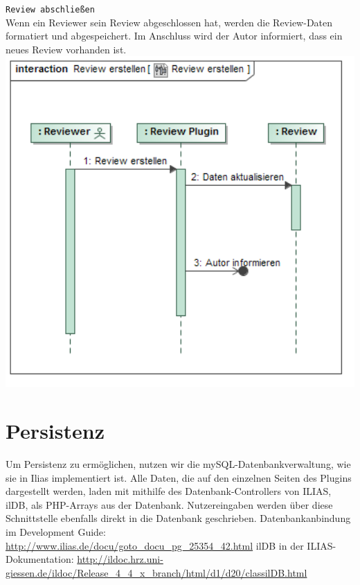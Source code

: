 \documentclass[a4paper]{scrreprt}
\begin{document}
\newpage
\texttt{Review abschließen}\\
Wenn ein Reviewer sein Review abgeschlossen hat, werden die Review-Daten formatiert und abgespeichert. Im Anschluss wird der Autor informiert, dass ein neues Review vorhanden ist.\\

\includegraphics[width=1.0\textwidth]{Sequence_Diagram__Review_erstellen__Review_erstellen.png}
\label{Review beenden}
\section{Persistenz}
Um Persistenz zu ermöglichen, nutzen wir die mySQL-Datenbankverwaltung, wie sie in Ilias implementiert ist. Alle Daten, die auf den einzelnen Seiten des Plugins dargestellt werden, laden mit mithilfe des Datenbank-Controllers von ILIAS, ilDB, als PHP-Arrays aus der Datenbank. Nutzereingaben werden über diese Schnittstelle ebenfalls direkt in die Datenbank geschrieben.
Datenbankanbindung im Development Guide: \url{http://www.ilias.de/docu/goto_docu_pg_25354_42.html}
ilDB in der ILIAS-Dokumentation: \url{http://ildoc.hrz.uni-giessen.de/ildoc/Release_4_4_x_branch/html/d1/d20/classilDB.html}
\end{document}
